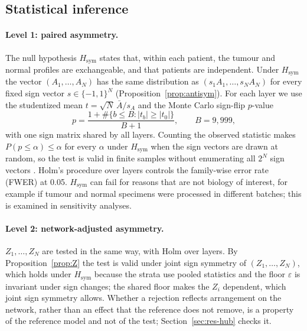 \subsection{Statistical inference}\label{sec:inference}
\paragraph{Level 1: paired asymmetry.} The null hypothesis $H_{\mathrm{sym}}$ states that, within each patient, the tumour and normal profiles are exchangeable, and that patients are independent. Under $H_{\mathrm{sym}}$ the vector $(A_1,\dots,A_N)$ has the same distribution as $(s_1A_1,\dots,s_NA_N)$ for every fixed sign vector $s\in\{-1,1\}^N$ (Proposition~\ref{prop:antisym}). For each layer we use the studentized mean $t=\sqrt{N}\,\bar A/s_A$ and the Monte Carlo sign-flip $p$-value
\begin{equation}
p=\frac{1+\#\{b\le B:|t_b|\ge|t_0|\}}{B+1},\qquad B=9{,}999,
\end{equation}
with one sign matrix shared by all layers. Counting the observed statistic makes $P(p\le\alpha)\le\alpha$ for every $\alpha$ under $H_{\mathrm{sym}}$ when the sign vectors are drawn at random, so the test is valid in finite samples without enumerating all $2^{N}$ sign vectors \citep{phipson2010}. Holm's procedure \citep{holm1979} over layers controls the family-wise error rate (FWER) at 0.05. $H_{\mathrm{sym}}$ can fail for reasons that are not biology of interest, for example if tumour and normal specimens were processed in different batches; this is examined in sensitivity analyses.

\paragraph{Level 2: network-adjusted asymmetry.} $Z_1,\dots,Z_N$ are tested in the same way, with Holm over layers. By Proposition~\ref{prop:Z} the test is valid under joint sign symmetry of $(Z_1,\dots,Z_N)$, which holds under $H_{\mathrm{sym}}$ because the strata use pooled statistics and the floor $\varepsilon$ is invariant under sign changes; the shared floor makes the $Z_i$ dependent, which joint sign symmetry allows. Whether a rejection reflects arrangement on the network, rather than an effect that the reference does not remove, is a property of the reference model and not of the test; Section~\ref{sec:res-hub} checks it.

